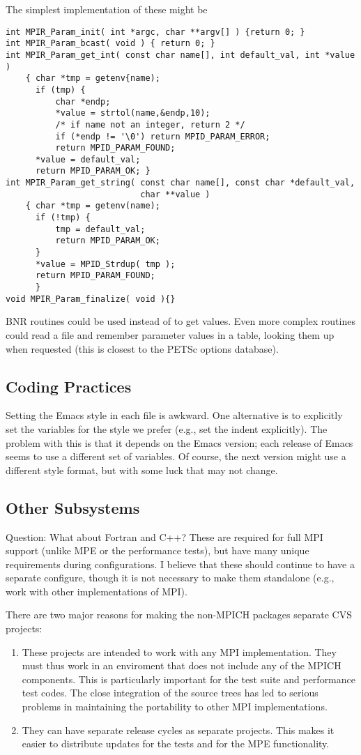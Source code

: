\documentclass{article}
\begin{document}
The simplest implementation of these might be
\begin{verbatim}
int MPIR_Param_init( int *argc, char **argv[] ) {return 0; }
int MPIR_Param_bcast( void ) { return 0; }
int MPIR_Param_get_int( const char name[], int default_val, int *value ) 
    { char *tmp = getenv{name); 
      if (tmp) { 
          char *endp;
          *value = strtol(name,&endp,10); 
          /* if name not an integer, return 2 */
          if (*endp != '\0') return MPID_PARAM_ERROR;
          return MPID_PARAM_FOUND;
      *value = default_val; 
      return MPID_PARAM_OK; }
int MPIR_Param_get_string( const char name[], const char *default_val,
                           char **value ) 
    { char *tmp = getenv(name); 
      if (!tmp) {
          tmp = default_val; 
          return MPID_PARAM_OK;
      }
      *value = MPID_Strdup( tmp );
      return MPID_PARAM_FOUND;
      }
void MPIR_Param_finalize( void ){}
\end{verbatim}
BNR routines could be
used instead of  to get values.  Even more complex
routines could read a  file and remember parameter
values in a table, looking them up when requested (this is closest to
the PETSc options database).

\subsection{Coding Practices}
Setting the Emacs style in each file is awkward.
One alternative is to explicitly set the variables for the style we prefer
(e.g., set the indent explicitly).  The problem with this is that it depends
on the Emacs version; each release of Emacs seems to use a different set of
variables.  Of course, the next version might use a different style format,
but with some luck that may not change.


\subsection{Other Subsystems}
Question: What about Fortran and C++?  These are required for full MPI support
(unlike MPE or the performance tests), but have many unique requirements
during configurations.  I believe that these should continue to have a
separate configure, though it is not necessary to make them standalone (e.g.,
work with other implementations of MPI).

There are two major reasons for making the non-MPICH packages separate CVS
projects:
\begin{enumerate}
\item These projects are intended to work with any MPI implementation.  They
  must thus work in an enviroment that does not include any of the MPICH
  components.  This is particularly important for the test suite and
  performance test codes.  The close integration of the source trees has led
  to serious problems in maintaining the portability to other MPI
  implementations.  
\item They can have separate release cycles as separate projects.  This makes
  it easier to distribute updates for the tests and for the MPE functionality.
\end{enumerate}
\end{document}
